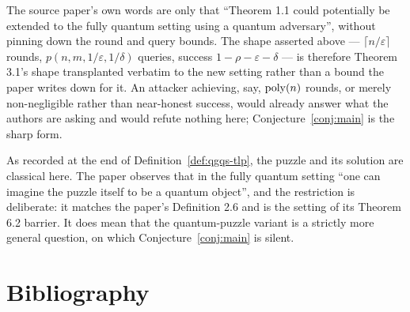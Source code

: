 \documentclass{aicr-conjecture}
\begin{document}
\begin{remark}\label{rem:sharp}
The source paper's own words are only that ``Theorem 1.1 could potentially
be extended to the fully quantum setting using a quantum adversary'',
without pinning down the round and query bounds. The shape asserted above
--- $\lceil n/\varepsilon \rceil$ rounds,
$p(n, m, 1/\varepsilon, 1/\delta)$ queries, success
$1 - \rho - \varepsilon - \delta$ --- is therefore Theorem 3.1's shape
transplanted verbatim to the new setting rather than a bound the paper
writes down for it. An attacker achieving, say, $\mathrm{poly}(n)$ rounds, or
merely non-negligible rather than near-honest success, would already answer
what the authors are asking and would refute nothing here;
Conjecture~\ref{conj:main} is the sharp form.
\end{remark}

\begin{remark}[scope]\label{rem:scope}
As recorded at the end of Definition~\ref{def:qgqs-tlp}, the puzzle and its
solution are classical here. The paper observes that in the fully quantum
setting ``one can imagine the puzzle itself to be a quantum object'', and
the restriction is deliberate: it matches the paper's Definition 2.6 and is
the setting of its Theorem 6.2 barrier. It does mean that the
quantum-puzzle variant is a strictly more general question, on which
Conjecture~\ref{conj:main} is silent.
\end{remark}

\section{Bibliography}
\end{document}
